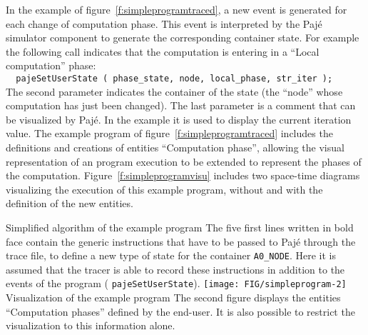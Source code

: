 In the example of figure~\ref{f:simpleprogramtraced}, a new event is
generated for each change of computation phase. This event is
interpreted by the Pajé simulator component to generate the
corresponding container state. For example the following call
indicates that the computation is entering in a ``Local computation''
phase: \\
{\small\tt\verb"  pajeSetUserState ( phase_state, node, local_phase, str_iter );"}\\
The second parameter indicates the container of the state (the
``node'' whose computation has just been changed).  The last parameter
is a comment that can be visualized by Pajé. In the example it is used
to display the current iteration value. The example program of
figure~\ref{f:simpleprogramtraced} includes the definitions and
creations of entities ``Computation phase'', allowing the visual
representation of an \ath program execution to be extended to
represent the phases of the computation.
Figure~\ref{f:simpleprogramvisu} includes two space-time diagrams
visualizing the execution of this example program, without and with
the definition of the new entities.
 
{Simplified algorithm of the example program}
{The five first lines written in bold face contain the generic
  instructions that have to be passed to Pajé through the trace file,
  to define a new type of state for the container \texttt{A0\_NODE}.
  Here it is assumed that the tracer is able to record these
  instructions in addition to the events of the program (
  \texttt{pajeSetUserState}).}
%
 {\texttt{[image: FIG/simpleprogram-2]}}
{Visualization of the example program} {The second figure displays the
  entities ``Computation phases'' defined by the end-user. It is also
  possible to restrict the visualization to this information alone.}


